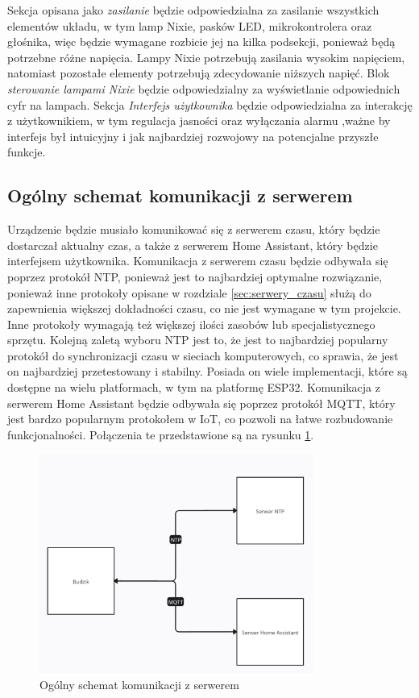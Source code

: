 \documentclass[../main.tex]{subfiles}
\begin{document}
Sekcja opisana jako \textit{zasilanie} będzie odpowiedzialna za zasilanie wszystkich elementów układu, w tym lamp Nixie, pasków LED, mikrokontrolera oraz głośnika,
więc będzie wymagane rozbicie jej na kilka podsekcji, ponieważ będą potrzebne różne napięcia. Lampy Nixie potrzebują zasilania wysokim napięciem,
natomiast pozostałe elementy potrzebują zdecydowanie niższych napięć. Blok \textit{sterowanie lampami Nixie} będzie odpowiedzialny za wyświetlanie odpowiednich cyfr na lampach.
Sekcja \textit{Interfejs użytkownika} będzie odpowiedzialna za interakcję z użytkownikiem, w tym regulacja jasności oraz wyłączania alarmu ,ważne by interfejs był 
intuicyjny i jak najbardziej rozwojowy na potencjalne przyszłe funkcje.
\subsection{Ogólny schemat komunikacji z serwerem}
Urządzenie będzie musiało komunikować się z serwerem czasu, który będzie dostarczał aktualny czas, a także z serwerem Home Assistant, który będzie interfejsem użytkownika.
Komunikacja z serwerem czasu będzie odbywała się poprzez protokół NTP, ponieważ jest to najbardziej optymalne rozwiązanie, ponieważ inne protokoły opisane w rozdziale \ref{sec:serwery_czasu}
służą do zapewnienia większej dokładności czasu, co nie jest wymagane w tym projekcie. Inne protokoły wymagają też większej ilości zasobów lub specjalistycznego sprzętu.
Kolejną zaletą wyboru NTP jest to, że jest to najbardziej popularny protokół do synchronizacji czasu w sieciach komputerowych, co sprawia, że jest on najbardziej przetestowany i stabilny.
Posiada on wiele implementacji, które są dostępne na wielu platformach, w tym na platformę ESP32.
Komunikacja z serwerem Home Assistant będzie odbywała się poprzez protokół MQTT, który jest bardzo popularnym protokołem w IoT, co pozwoli na łatwe rozbudowanie funkcjonalności.
Połączenia te przedstawione są na rysunku \ref{fig:communication}.
\begin{figure}[H]
    \centering
    \includegraphics[width=0.8\textwidth]{polaczenia.png}
    \caption{Ogólny schemat komunikacji z serwerem}
    \label{fig:communication}
\end{figure}
\end{document}
